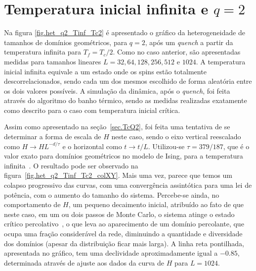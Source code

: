 \section{Temperatura inicial infinita e $q=2$}
\label{sec.TinfQ2}

Na figura \ref{fig.het_q2_Tinf_Tc2} é apresentado o gráfico da heterogeneidade de tamanhos de domínios geométricos, para $q=2$, após um \textit{quench} a partir da temperatura infinita para $T_f=T_c/2$. Como no caso anterior, são apresentadas medidas para tamanhos lineares $L=32, 64, 128, 256, 512$ e $1024$. A temperatura inicial infinita equivale a um estado onde os spins estão totalmente descorrelacionados, sendo cada um dos mesmos escolhido de forma aleatória entre os dois valores possíveis. A simulação da dinâmica, após o \textit{quench}, foi feita através do algoritmo do banho térmico, sendo as medidas realizadas exatamente como descrito para o caso com temperatura inicial crítica.

Assim como apresentado na seção~\ref{sec.TcQ2}, foi feita uma tentativa de se determinar a forma de escala de $H$ neste caso, sendo o eixo vertical reescalado como $H \rightarrow HL^{-d/\tau}$ e o horizontal como $t \rightarrow t/L$. Utilizou-se $\tau = 379/187$, que é o valor exato para domínios geométricos no modelo de Ising, para a temperatura infinita~\cite{PRLJeferson,PREJeferson}. O resultado pode ser observado na figura~\ref{fig.het_q2_Tinf_Tc2_colXY}. Mais uma vez, parece que temos um colapso progressivo das curvas, com uma convergência assintótica para uma lei de potência, com o aumento do tamanho do sistema. Percebe-se ainda, no comportamento de $H$, um pequeno decaimento inicial, atribuído ao fato de que neste caso, em um ou dois passos de Monte Carlo, o sistema atinge o estado crítico percolativo~\cite{PRLJeferson}, o que leva ao aparecimento de um domínio percolante, que ocupa uma fração considerável da rede, diminuindo a quantidade e diversidade dos domínios (apesar da distribuição ficar mais larga). A linha reta pontilhada, apresentada no gráfico, tem uma declividade aproximadamente igual a $-0.85$, determinada através de ajuste aos dados da curva de $H$ para $L=1024$.

